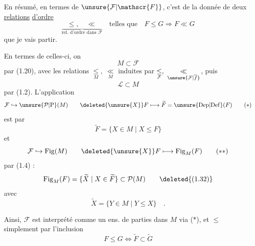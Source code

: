 En résumé, en termes de $\unsure{\mathcal{F}|\mathscr{F}}$, c'est de la donnée de deux \uline{relations} \uline{d'ordre}
\[
\boxed{\underset{\overbrace{\scriptstyle\text{rel. d'ordre dans }\mathcal{F}}}{\leq,\quad\ll}\quad\text{telles que}\quad F\leq G \Rightarrow F\ll G}
\tag*{(1.30)}
\]
que je vais partir.

En termes de celles-ci, on  
\[
M\subset\mathcal{F}
\]
par (1.20), avec les relations $\underset{M}{\leq},\ \underset{M}{\ll}$ induites par $\underset{\mathcal{F}}{\leq},\ \underset{\unsure{\mathcal{F}|\overline{f}}}{\ll}$, puis
\[
\mathcal{L}\subset M
\]
par (1.2). L'application
\[
\mathcal{F}\hookrightarrow\unsure{\mathcal{P}|\mathrm{P}}(M)\qquad
\deleted{\unsure{X}}F\longmapsto\widetilde F=\unsure{\mathrm{Dep}|\mathrm{Def}}(F)
\tag*{($*$)}
\]
est   par
\[
\widetilde F=\{X\in M\mid X\leq F\}
\tag*{(1.31)}
\]
et
\[
\mathcal{F}\hookrightarrow\mathrm{Fig}(M)\qquad
\deleted{\unsure{X}}F\longmapsto\mathrm{Fig}_{M}(F)
\tag*{($**$)}
\]
par (1.4) :
\[
\mathrm{Fig}_{M}(F)=\{\widetilde X\mid X\in\widetilde F\}\subset\mathcal{P}(M)
\tag*{\deleted{(1.32)}}
\]
avec
\[
\widetilde X=\{Y\in M\mid Y\leq X\}\quad.
\]

Ainsi, $\mathcal{F}$ est interprété comme un ens. de parties dans $M$ via ($*$), et $\leq$  simplement par l'inclusion
\[
F\leq G\Longleftrightarrow\widetilde F\subset\widetilde G
\tag*{(1.32)}
\]

